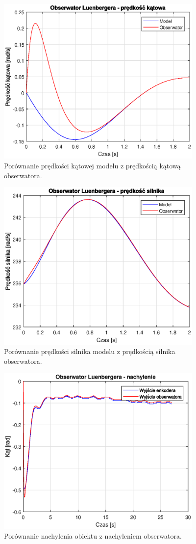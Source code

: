 \documentclass[11pt,a4paper]{article}
\begin{document}
\begin{figure}[H]
	\centering
	\includegraphics[width=4in]{Figures/obsv_model_dalpha_v.eps}
	\caption{Porównanie prędkości kątowej modelu z prędkością kątową obserwatora.}
	\label{fig:obsv_model_dalpha_v}
\end{figure}

\begin{figure}[H]
	\centering
	\includegraphics[width=4in]{Figures/obsv_model_w_v.eps}
	\caption{Porównanie prędkości silnika modelu z prędkością silnika obserwatora.}
	\label{fig:obsv_model_w_v}
\end{figure}

\begin{figure}[H]
	\centering
	\includegraphics[width=4in]{Figures/obsv_obj_alpha_v.eps}
	\caption{Porównanie nachylenia obiektu z nachyleniem obserwatora.}
	\label{fig:obsv_obj_alpha_v}
\end{figure}
\end{document}
